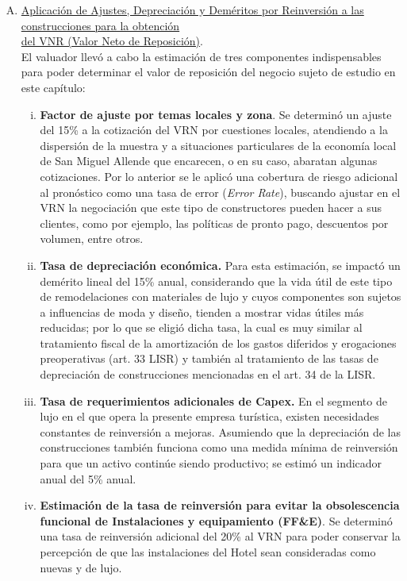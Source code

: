 \begin{enumerate}[a)]
\begin{enumerate}[B.1.]
\begin{figure}[H]
\end{figure}

\item  \underline{Aplicación de Ajustes, Depreciación y Deméritos por Reinversión a las construcciones para la obtención} \\\underline{del VNR (Valor Neto de Reposición)}.\\

 El valuador llevó a cabo la estimación de tres componentes indispensables para poder determinar el valor de reposición del negocio sujeto de estudio en este capítulo: 

\begin{enumerate}[i)]
\item \textcolor{principal}{\textbf{Factor de ajuste por temas locales y zona}}. Se determinó un ajuste del 15\% a la cotización del VRN por cuestiones locales, atendiendo a la dispersión de la muestra y a situaciones particulares de la economía local de San Miguel Allende que encarecen, o en su caso, abaratan  algunas cotizaciones.  Por lo anterior se le aplicó una cobertura de riesgo adicional al pronóstico como una tasa de error (\textit{Error Rate}), buscando ajustar en el VRN la negociación que este tipo de constructores pueden hacer a sus clientes, como por ejemplo, las políticas de pronto pago, descuentos por volumen, entre otros.

\item \textcolor{principal}{\textbf{Tasa de depreciación económica.}} Para esta estimación, se impactó un demérito lineal del 15\% anual, considerando  que la vida útil de este tipo de remodelaciones con materiales de lujo y cuyos componentes son sujetos a influencias de moda y diseño, tienden a mostrar vidas útiles más reducidas; por lo que se eligió dicha tasa, la cual es muy similar al tratamiento fiscal de la amortización de los gastos diferidos y erogaciones preoperativas (art. 33 LISR) y tambi\'en al tratamiento de las tasas de depreciación de construcciones mencionadas en el art. 34 de la LISR.

\item \textcolor{principal}{\textbf{Tasa de requerimientos adicionales de Capex.}} En el segmento de lujo en el que opera la presente empresa turística, existen necesidades constantes de reinversión a mejoras. Asumiendo que la depreciación de las construcciones también funciona como una medida mínima de reinversión para que un activo continúe siendo productivo; se estimó un indicador anual del 5\% anual.

\item \textcolor{principal}{\textbf{Estimación de la tasa de reinversión para evitar la obsolescencia funcional de Instalaciones y equipamiento (FF\&E)}}.  Se determinó una tasa de reinversión adicional del 20\% al VRN para poder conservar la percepción de que las instalaciones del Hotel sean consideradas como nuevas y de lujo.  

\end{enumerate}
\end{enumerate}
\end{enumerate}

